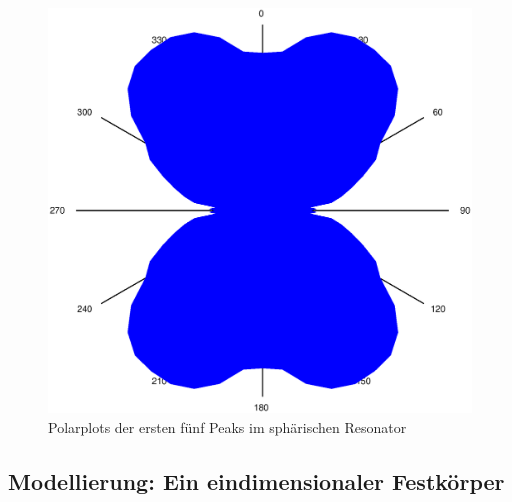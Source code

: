 \begin{figure}
\includegraphics[scale=0.2]{FP-V23data/2.3_6571.732Hz.eps}
\caption{Polarplots der ersten fünf Peaks im sphärischen Resonator}
\label{fig:polar}
\end{figure}
\subsection{Modellierung: Ein eindimensionaler Festkörper}
